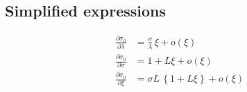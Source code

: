 \subsection*{Simplified expressions}

{\color{red}
\begin{align*}
  \frac{\partial \sigma_0}{\partial \lambda}
  &= \frac{\sigma}{\lambda} \, \xi + o(\xi)\\
 \frac{\partial \sigma_0}{\partial \sigma}
  &= 1 + L \xi + o(\xi)\\
\frac{\partial \sigma_0 }{\partial \xi}
  &= \sigma L \, \left\{ 1 + L \xi \right\} +  o(\xi)
\end{align*}
}

